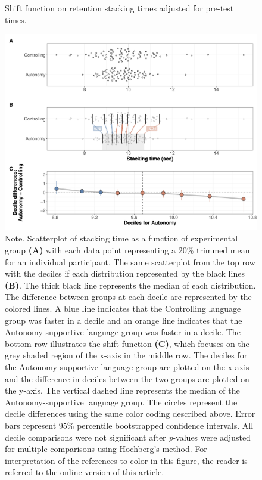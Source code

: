 \documentclass[man,floatsintext,donotrepeattitle,letterpaper,12pt]{apa7}
\begin{document}
\begin{figure}[htbp]
    \caption{Shift function on retention stacking times adjusted for pre-test times.}
    \centering
    \includegraphics[scale=0.55]{../../figs/fig1.pdf}
    \setlength{\belowcaptionskip}{-2em}
    \caption*{\singlespacing \small Note. \normalfont Scatterplot of stacking time as a function of experimental group \textbf{(A)} with each data point representing a 20\% trimmed mean for an individual participant. The same scatterplot from the top row with the deciles if each distribution represented by the black lines \textbf{(B)}. The thick black line represents the median of each distribution. The difference between groups at each decile are represented by the colored lines. A blue line indicates that the Controlling language group was faster in a decile and an orange line indicates that the Autonomy-supportive language group was faster in a decile. The bottom row illustrates the shift function \textbf{(C)}, which focuses on the grey shaded region of the x-axis in the middle row. The deciles for the Autonomy-supportive language group are plotted on the x-axis and the difference in deciles between the two groups are plotted on the y-axis. The vertical dashed line represents the median of the Autonomy-supportive language group. The circles represent the decile differences using the same color coding described above. Error bars represent 95\% percentile bootstrapped confidence intervals. All decile comparisons were not significant after \emph{p}-values were adjusted for multiple comparisons using Hochberg's method. For interpretation of the references to color in this figure, the reader is referred to the online version of this article.}
    \label{fig:fig1}
\end{figure}
\end{document}
